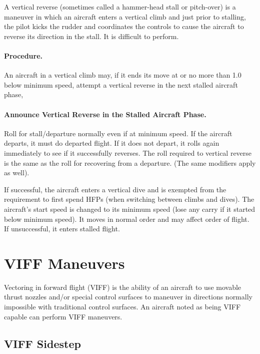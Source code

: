\begin{advancedrules}
A vertical reverse (sometimes called a hammer-head stall or pitch-over) is a maneuver in which an aircraft enters a vertical climb and just prior to stalling, the pilot kicks the rudder and coordinates the controls to cause the aircraft to reverse its direction in the stall. It is difficult to perform.

\paragraph{Procedure.} An aircraft in a vertical climb may, if it ends its move at or no more than 1.0 below minimum speed, attempt a vertical reverse in the next stalled aircraft phase,

\paragraph{Announce Vertical Reverse in the Stalled Aircraft Phase.} Roll for stall/departure normally even if at minimum speed. If the aircraft departs, it must do departed flight. If it does not depart, it rolls again immediately to see if it successfully reverses. The roll required to vertical reverse is the same as the roll for recovering from a departure. (The same modifiers apply as well). 

If successful, the aircraft enters a vertical dive and is exempted from the requirement to first spend HFPs (when switching between climbs and dives). The aircraft's start speed is changed to its minimum speed (lose any  carry if it started below minimum speed). It moves in normal order and may affect order of flight. If unsuccessful, it enters stalled flight.

\section{VIFF Maneuvers}
\label{rule:viff-maneuvers}

Vectoring in forward flight (VIFF) is the ability of an aircraft to use movable thrust nozzles and/or special control surfaces to maneuver in directions normally impossible with traditional control surfaces. An aircraft noted as being VIFF capable can perform VIFF maneuvers. 

\subsection{VIFF Sidestep}


\end{advancedrules}
